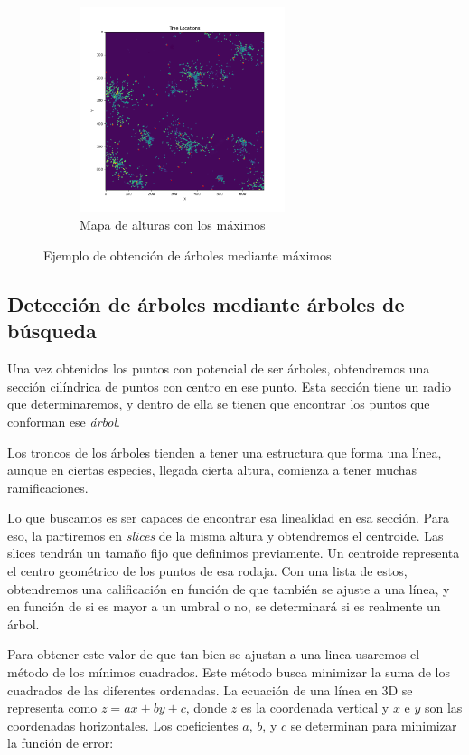 \begin{figure}[h]
\begin{subfigure}[t]{.4\textwidth}
  \centering
  \includegraphics[height=6cm]{imaxes/chm_with_trees.png}
  \caption{Mapa de alturas con los máximos}
  \label{fig:chm_max}
\end{subfigure}

\caption{Ejemplo de obtención de árboles mediante máximos}
\label{fig:chmexample}
\end{figure}

\subsection{Detección de árboles mediante árboles de búsqueda}

Una vez obtenidos los puntos con potencial de ser árboles, obtendremos una sección cilíndrica de puntos con centro en ese punto. Esta sección tiene un radio que determinaremos, y dentro de ella se tienen que encontrar los puntos que conforman ese \textit{árbol}.

Los troncos de los árboles tienden a tener una estructura que forma una línea, aunque en ciertas especies, llegada cierta altura, comienza a tener muchas ramificaciones.

Lo que buscamos es ser capaces de encontrar esa linealidad en esa sección. Para eso, la partiremos en \textit{slices} de la misma altura y obtendremos el centroide. Las slices tendrán un tamaño fijo que definimos previamente. Un centroide representa el centro geométrico de los puntos de esa rodaja. Con una lista de estos, obtendremos una calificación en función de que también se ajuste a una línea, y en función de si es mayor a un umbral o no, se determinará si es realmente un árbol.

Para obtener este valor de que tan bien se ajustan a una linea usaremos el método de los mínimos cuadrados. Este método busca minimizar la suma de los cuadrados de las diferentes ordenadas. La ecuación de una línea en 3D se representa como $z = ax + by + c$, donde $z$ es la coordenada vertical y $x$ e $y$ son las coordenadas horizontales. Los coeficientes $a$, $b$, y $c$ se determinan para minimizar la función de error:

